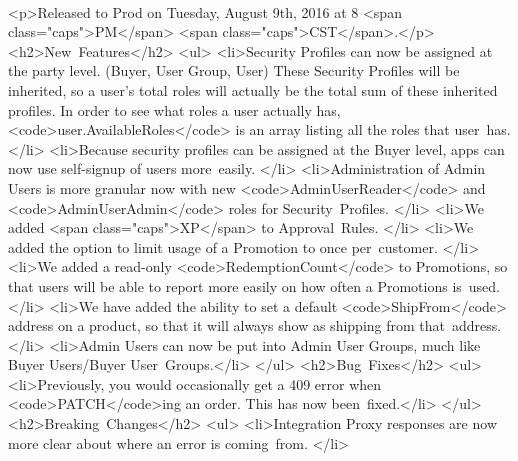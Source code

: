 \documentclass{memoir}%
\begin{document}
%
\paragraph*{}%
<p>Released to Prod on Tuesday, August 9th, 2016 at 8 <span class="caps">PM</span> <span class="caps">CST</span>.</p>\newline%
<h2>New~Features</h2>\newline%
<ul>\newline%
<li>Security Profiles can now be assigned at the party level. (Buyer, User Group, User) These Security Profiles will be inherited, so a user’s total roles will actually be the total sum of these inherited profiles. In order to see what roles a user actually has, <code>user.AvailableRoles</code> is an array listing all the roles that user~has.</li>\newline%
<li>Because security profiles can be assigned at the Buyer level, apps can now use self{-}signup of users more~easily. </li>\newline%
<li>Administration of Admin Users is more granular now with new <code>AdminUserReader</code> and <code>AdminUserAdmin</code> roles for Security~Profiles. </li>\newline%
<li>We added <span class="caps">XP</span> to Approval~Rules. </li>\newline%
<li>We added the option to limit usage of a Promotion to once per~customer. </li>\newline%
<li>We added a read{-}only <code>RedemptionCount</code> to Promotions, so that users will be able to report more easily on how often a Promotions is~used.</li>\newline%
<li>We have added the ability to set a default <code>ShipFrom</code> address on a product, so that it will always show as shipping from that~address. </li>\newline%
<li>Admin Users can now be put into Admin User Groups, much like Buyer Users/Buyer User~Groups.</li>\newline%
</ul>\newline%
<h2>Bug~Fixes</h2>\newline%
<ul>\newline%
<li>Previously, you would occasionally get a 409 error when <code>PATCH</code>ing an order. This has now been~fixed.</li>\newline%
</ul>\newline%
<h2>Breaking~Changes</h2>\newline%
<ul>\newline%
<li>Integration Proxy responses are now more clear about where an error is coming~from. </li>\newline%
\end{document}
